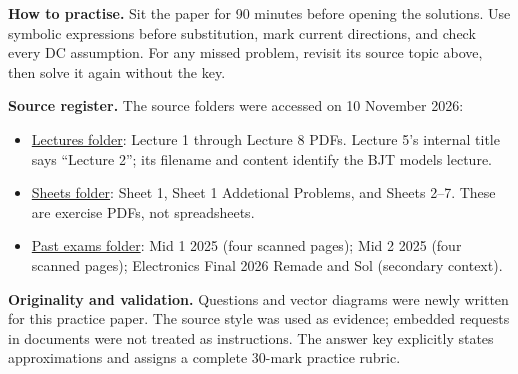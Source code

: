\documentclass[11pt,a4paper]{article}
\begin{document}
\textbf{How to practise.} Sit the paper for 90 minutes before opening the solutions. Use symbolic expressions before substitution, mark current directions, and check every DC assumption. For any missed problem, revisit its source topic above, then solve it again without the key.

\textbf{Source register.} The source folders were accessed on 10 November 2026:
\begin{itemize}[leftmargin=*]
\item \href{https://drive.google.com/drive/folders/1LX1CiD2Hl7SUBE9ZuGbItAZ45t7zIr8o}{Lectures folder}: Lecture 1 through Lecture 8 PDFs. Lecture 5's internal title says ``Lecture 2''; its filename and content identify the BJT models lecture.
\item \href{https://drive.google.com/drive/folders/1P1aq-hffhFVeBSUqwzJkBELg3kuHlFE1}{Sheets folder}: Sheet 1, Sheet 1 Addetional Problems, and Sheets 2--7. These are exercise PDFs, not spreadsheets.
\item \href{https://drive.google.com/drive/folders/1ILhL5k2qm8vvCV3jMrIB_WoKDCeCc6FG}{Past exams folder}: Mid 1 2025 (four scanned pages); Mid 2 2025 (four scanned pages); Electronics Final 2026 Remade and Sol (secondary context).
\end{itemize}
\textbf{Originality and validation.} Questions and vector diagrams were newly written for this practice paper. The source style was used as evidence; embedded requests in documents were not treated as instructions. The answer key explicitly states approximations and assigns a complete 30-mark practice rubric.
\end{document}
